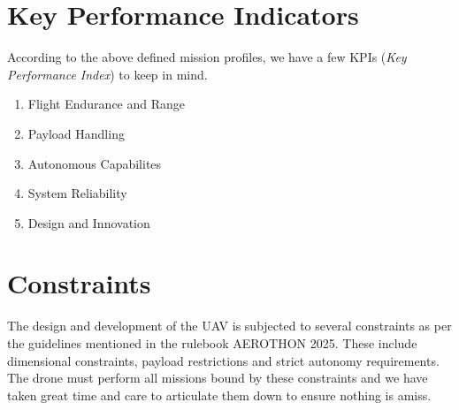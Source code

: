 \documentclass[12pt]{report}
\begin{document}
    \section{Key Performance Indicators}
    According to the above defined mission profiles, we have a few KPIs (\textit{Key Performance Index}) to keep in mind.
    \begin{enumerate}
      \item Flight Endurance and Range 
      \item Payload Handling 
      \item Autonomous Capabilites
      \item System Reliability
      \item Design and Innovation
    \end{enumerate}
    \section{Constraints}
    The design and development of the UAV is subjected to several constraints as per the guidelines mentioned in the rulebook AEROTHON 2025. These include dimensional constraints, payload restrictions and strict autonomy requirements. The drone must perform all missions bound by these constraints and we have taken great time and care to articulate them down to ensure nothing is amiss.
\end{document}
